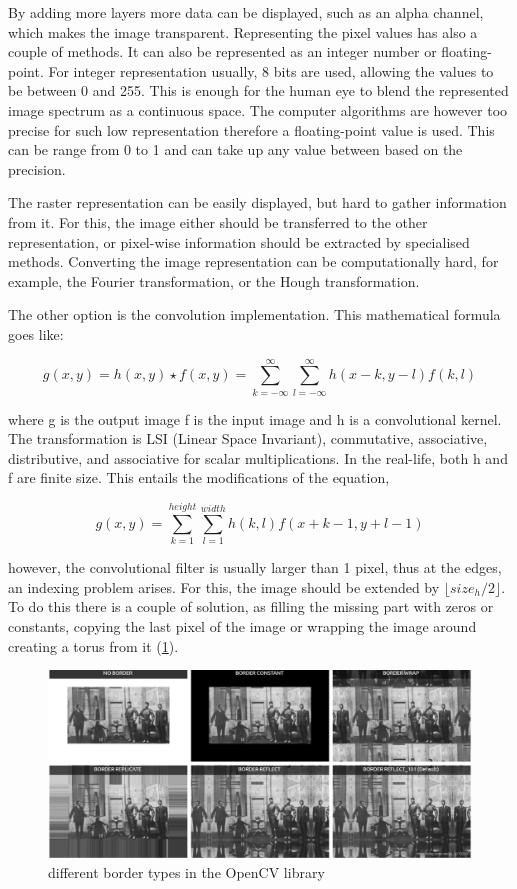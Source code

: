 By adding more layers more data can be displayed, such as an alpha channel, which makes the image transparent.
Representing the pixel values has also a couple of methods.
It can also be represented as an integer number or floating-point.
For integer representation usually, 8 bits are used, allowing the values to be between 0 and 255.
This is enough for the human eye to blend the represented image spectrum as a continuous space.
The computer algorithms are however too precise for such low representation therefore a floating-point value is used.
This can be range from 0 to 1 and can take up any value between based on the precision.

The raster representation can be easily displayed, but hard to gather information from it.
For this, the image either should be transferred to the other representation, or pixel-wise information should be extracted by specialised methods.
Converting the image representation can be computationally hard, for example, the Fourier transformation, or the Hough \cite{Duda:1972:UHT:361237.361242} transformation.

The other option is the convolution implementation.
This mathematical formula goes like:

\begin{equation}
    g(x,y) = h(x,y)\star f(x,y) = \sum_{k=-\infty}^{\infty} \sum_{l=-\infty}^{\infty} h(x-k,y-l) f(k,l)
\end{equation}

where g is the output image f is the input image and h is a convolutional kernel.
The transformation is LSI (Linear Space Invariant), commutative, associative, distributive, and associative for scalar multiplications.
In the real-life, both h and f are finite size.
This entails the modifications of the equation,

\begin{equation}
g(x,y)=\sum_{k=1}^{height} \sum_{l=1}^{width} h(k,l) f(x+k-1,y+l-1)
\end{equation}

however, the convolutional filter is usually larger than 1 pixel, thus at the edges, an indexing problem arises.
For this, the image should be extended by $\lfloor size_h/2 \rfloor$.
To do this there is a couple of solution, as filling the missing part with zeros or constants, copying the last pixel of the image or wrapping the image around creating a torus from it (\cref{fig:borders}).

\begin{figure}
    \centering
    \includegraphics[width=.9\linewidth]{images/borders.jpg}
    \caption{different border types in the OpenCV library \cite{img_border}}
    \label{fig:borders}
\end{figure}

